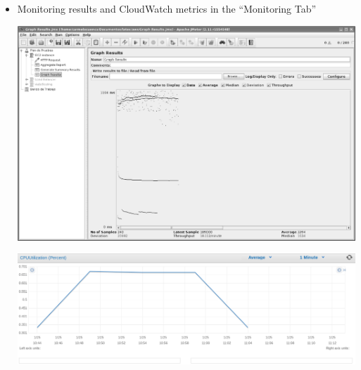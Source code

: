 \documentclass{beamer}
\begin{document}
\begin{frame}
\begin{itemize}
\begin{enumerate}
\end{enumerate}

\item Monitoring results and CloudWatch metrics in the ``Monitoring Tab''
\begin{center}
\includegraphics[scale=0.15]{plandeprueba2.eps}
\end{center}
\begin{center}
\includegraphics[scale=0.15]{cpuutilization.png}
\end{center}
\end{itemize}

\end{frame}
\end{document}

